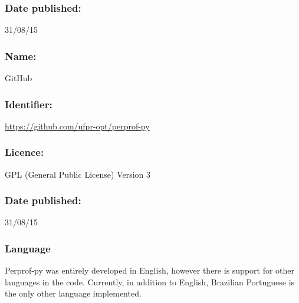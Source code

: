     \subsubsection*{Date published:} 31/08/15

\CodeRepository

    \subsubsection*{Name:} GitHub

    \subsubsection*{Identifier:} \url{https://github.com/ufpr-opt/perprof-py}

    \subsubsection*{Licence:} GPL (General Public License) Version 3

    \subsubsection*{Date published:} 31/08/15

\subsubsection*{Language}

    Perprof-py was entirely developed in English, however there is support for
    other languages in the code. Currently,  in addition to English,  Brazilian Portuguese is the only other language implemented.

